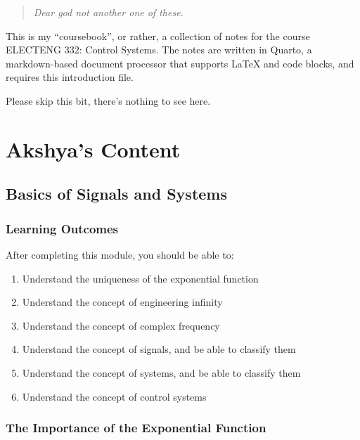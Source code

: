 \documentclass[
  14pt,
  a4paper,
  oneside,
  open=any,
  a4paper,
  14pt]{report}
\begin{document}

\begin{quote}
\emph{Dear god not another one of these.}
\end{quote}

This is my ``coursebook'', or rather, a collection of notes for the
course ELECTENG 332: Control Systems. The notes are written in Quarto, a
markdown-based document processor that supports LaTeX and code blocks,
and requires this introduction file.

Please skip this bit, there's nothing to see here.

\part{Akshya's Content}

\chapter{Basics of Signals and
Systems}\label{basics-of-signals-and-systems}

\section*{Learning Outcomes}\label{learning-outcomes}


After completing this module, you should be able to:

\begin{enumerate}
\def\labelenumi{\arabic{enumi}.}
\item
  Understand the uniqueness of the exponential function
\item
  Understand the concept of engineering infinity
\item
  Understand the concept of complex frequency
\item
  Understand the concept of signals, and be able to classify them
\item
  Understand the concept of systems, and be able to classify them
\item
  Understand the concept of control systems
\end{enumerate}

\section{The Importance of the Exponential
Function}\label{the-importance-of-the-exponential-function}
\end{document}
